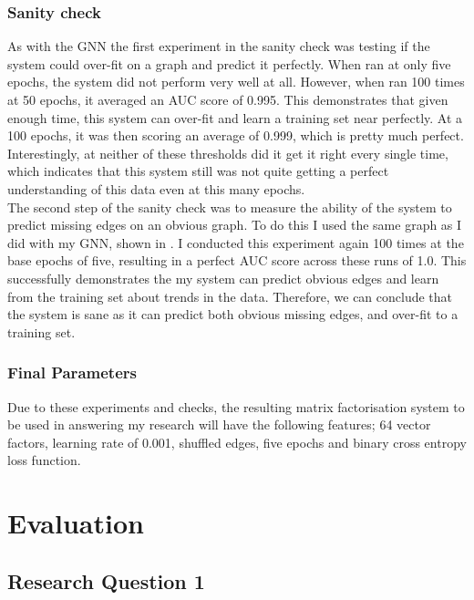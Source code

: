 \documentclass{l4proj}
\begin{document}
\subsection{Sanity check}

As with the GNN the first experiment in the sanity check was testing if the system could over-fit on a graph and predict it perfectly. When ran at only five epochs, the system did not perform very well at all. However, when ran 100 times at 50 epochs, it averaged an AUC score of 0.995. This demonstrates that given enough time, this system can over-fit and learn a training set near perfectly. At a 100 epochs, it was then scoring an average of 0.999, which is pretty much perfect. Interestingly, at neither of these thresholds did it get it right every single time, which indicates that this system still was not quite getting a perfect understanding of this data even at this many epochs. \\

The second step of the sanity check was to measure the ability of the system to predict missing edges on an obvious graph. To do this I used the same graph as I did with my GNN, shown in . I conducted this experiment again 100 times at the base epochs of five, resulting in a perfect AUC score across these runs of 1.0. This successfully demonstrates the my system can predict obvious edges and learn from the training set about trends in the data. Therefore, we can conclude that the system is sane as it can predict both obvious missing edges, and over-fit to a training set. \\

\subsection{Final Parameters}

Due to these experiments and checks, the resulting matrix factorisation system to be used in answering my research will have the following features; 64 vector factors, learning rate of 0.001, shuffled edges, five epochs and binary cross entropy loss function. \\

\chapter{Evaluation} 

\section{Research Question 1}
\end{document}
